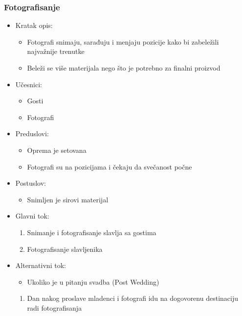 \documentclass[a4paper]{article}
\begin{document}
\subsubsection{Fotografisanje}
\begin{itemize}
    \item Kratak opis: 
    \begin{itemize}
        \item Fotografi snimaju, sarađuju i menjaju pozicije kako bi zabeležili najvažnije trenutke
        \item Beleži se više materijala nego što je potrebno za finalni proizvod
    \end{itemize}
    \item Učesnici:
        \begin{itemize}
        \item Gosti
        \item Fotografi
    \end{itemize}
    \item Preduslovi:
        \begin{itemize}
            \item Oprema je setovana
            \item Fotografi su na pozicijama i čekaju da svečanost počne
        \end{itemize}
    \item Postuslov:
        \begin{itemize}
            \item Snimljen je sirovi materijal
            \end{itemize}
    \item Glavni tok:
        \begin{enumerate}
            \item Snimanje i fotografisanje slavlja sa gostima
            \item Fotografisanje slavljenika
        \end{enumerate}
    \item Alternativni tok:
        \begin{itemize}
            \item Ukoliko je u pitanju svadba (Post Wedding)
        \end{itemize}
        \begin{enumerate}
            \item Dan nakog proslave mladenci i fotografi idu na dogovorenu destinaciju radi fotografisanja
        \end{enumerate}
\end{itemize}
\end{document}
